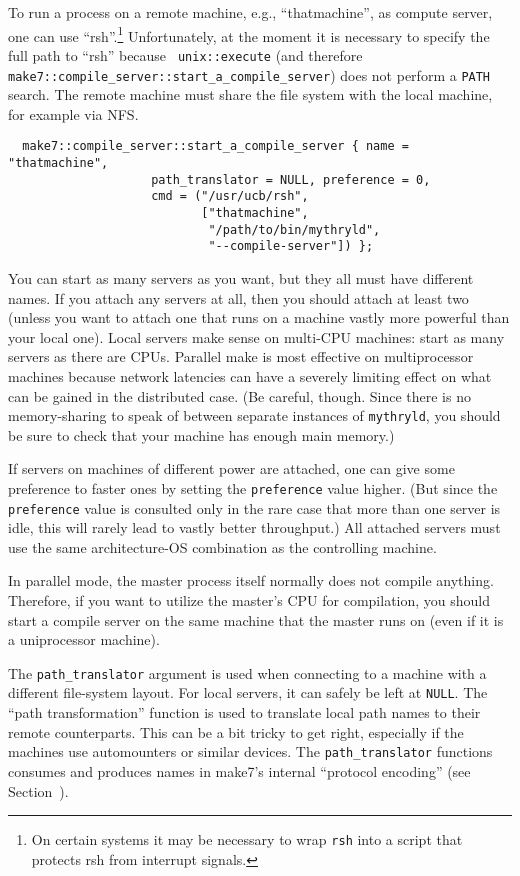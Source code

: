 To run a process on a remote machine, e.g., ``thatmachine'', as
compute server, one can use ``rsh''.\footnote{On certain systems it
may be necessary to wrap {\tt rsh} into a script that protects rsh
from interrupt signals.}  Unfortunately, at the moment it
is necessary to specify the full path to ``rsh'' because {\tt
unix::execute} (and therefore {\tt make7::compile_server::start_a_compile_server})
does not perform a {\tt PATH} search. The remote machine
must share the file system with the local machine, for example via NFS.

\begin{verbatim}
  make7::compile_server::start_a_compile_server { name = "thatmachine",
                    path_translator = NULL, preference = 0,
                    cmd = ("/usr/ucb/rsh",
                           ["thatmachine",
                            "/path/to/bin/mythryld",
                            "--compile-server"]) };
\end{verbatim}

You can start as many servers as you want, but they all must have
different names.  If you attach any servers at all, then you should
attach at least two (unless you want to attach one that runs on a
machine vastly more powerful than your local one).  Local servers make
sense on multi-CPU machines: start as many servers as there are CPUs.
Parallel make is most effective on multiprocessor machines because
network latencies can have a severely limiting effect on what can be
gained in the distributed case.
(Be careful, though.  Since there is no memory-sharing to speak of
between separate instances of {\tt mythryld}, you should be sure to check
that your machine has enough main memory.)

If servers on machines of different power are attached, one can give
some preference to faster ones by setting the {\tt preference} value higher.
(But since the {\tt preference} value is consulted only in the rare case
that more than one server is idle, this will rarely lead to vastly
better throughput.) All attached servers must use the same
architecture-OS combination as the controlling machine.

In parallel mode, the master process itself normally does not compile
anything.  Therefore, if you want to utilize the master's CPU for
compilation, you should start a compile server on the same machine
that the master runs on (even if it is a uniprocessor machine).

The {\tt path_translator} argument is used when connecting to a machine with
a different file-system layout.  For local servers, it can safely be
left at {\tt NULL}.  The ``path transformation'' function is used to
translate local path names to their remote counterparts.  This can be
a bit tricky to get right, especially if the machines use automounters
or similar devices.  The {\tt path_translator} functions consumes and
produces names in make7's internal ``protocol encoding'' (see
Section~).


